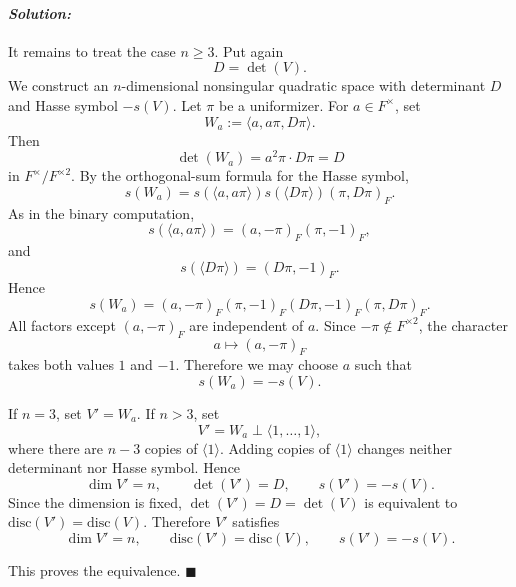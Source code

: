 \documentclass[12pt, a4paper]{article}
\newcommand{\disc}{\text{disc}}
\newenvironment{solution}
  {\paragraph{\textit{Solution:}}\par\medskip}
  {\hfill$\blacksquare$\vspace{0.1cm}}
\begin{document}
\begin{solution}
It remains to treat the case \(n\ge 3\). Put again
\[
D=\det(V).
\]
We construct an \(n\)-dimensional nonsingular quadratic space with determinant
\(D\) and Hasse symbol \(-s(V)\). Let \(\pi\) be a uniformizer. For
\(a\in F^\times\), set
\[
W_a:=\langle a,a\pi,D\pi\rangle.
\]
Then
\[
\det(W_a)=a^2\pi\cdot D\pi=D
\]
in \(F^\times/F^{\times 2}\). By the orthogonal-sum formula for the Hasse
symbol,
\[
s(W_a)
=
s(\langle a,a\pi\rangle)
s(\langle D\pi\rangle)
(\pi,D\pi)_F.
\]
As in the binary computation,
\[
s(\langle a,a\pi\rangle)=(a,-\pi)_F(\pi,-1)_F,
\]
and
\[
s(\langle D\pi\rangle)=(D\pi,-1)_F.
\]
Hence
\[
s(W_a)
=
(a,-\pi)_F
(\pi,-1)_F
(D\pi,-1)_F
(\pi,D\pi)_F.
\]
All factors except \((a,-\pi)_F\) are independent of \(a\). Since
\(-\pi\notin F^{\times 2}\), the character
\[
a\longmapsto (a,-\pi)_F
\]
takes both values \(1\) and \(-1\). Therefore we may choose \(a\) such that
\[
s(W_a)=-s(V).
\]

If \(n=3\), set \(V'=W_a\). If \(n>3\), set
\[
V'=W_a\perp \langle 1,\dots,1\rangle,
\]
where there are \(n-3\) copies of \(\langle 1\rangle\). Adding copies of
\(\langle 1\rangle\) changes neither determinant nor Hasse symbol. Hence
\[
\dim V'=n,\qquad \det(V')=D,\qquad s(V')=-s(V).
\]
Since the dimension is fixed, \(\det(V')=D=\det(V)\) is equivalent to
\(\disc(V')=\disc(V)\). Therefore \(V'\) satisfies
\[
\dim V'=n,\qquad \disc(V')=\disc(V),\qquad s(V')=-s(V).
\]

This proves the equivalence.
\end{solution}
\end{document}
